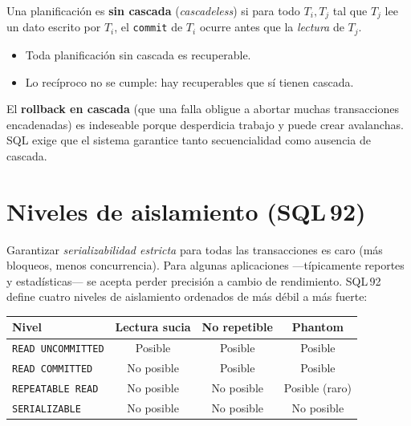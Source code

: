 \documentclass[11pt,a4paper]{article}
\begin{document}
Una planificación es \textbf{sin cascada} (\emph{cascadeless}) si para
todo $T_i, T_j$ tal que $T_j$ lee un dato escrito por $T_i$, el
\texttt{commit} de $T_i$ ocurre antes que la \emph{lectura} de $T_j$.

\begin{itemize}
    \item Toda planificación sin cascada es recuperable.
    \item Lo recíproco no se cumple: hay recuperables que sí tienen
    cascada.
\end{itemize}

El \textbf{rollback en cascada} (que una falla obligue a abortar muchas
transacciones encadenadas) es indeseable porque desperdicia trabajo y
puede crear avalanchas. SQL exige que el sistema garantice tanto
secuencialidad como ausencia de cascada.

\section{Niveles de aislamiento (SQL\,92)}

Garantizar \emph{serializabilidad estricta} para todas las transacciones
es caro (más bloqueos, menos concurrencia). Para algunas aplicaciones
---típicamente reportes y estadísticas--- se acepta perder precisión a
cambio de rendimiento. SQL\,92 define cuatro niveles de aislamiento
ordenados de más débil a más fuerte:

\begin{center}
\begin{tabular}{lccc}
\toprule
Nivel & Lectura sucia & No repetible & Phantom \\
\midrule
\texttt{READ UNCOMMITTED} & Posible    & Posible    & Posible \\
\texttt{READ COMMITTED}   & No posible & Posible    & Posible \\
\texttt{REPEATABLE READ}  & No posible & No posible & Posible (raro) \\
\texttt{SERIALIZABLE}     & No posible & No posible & No posible \\
\bottomrule
\end{tabular}
\end{center}
\end{document}
